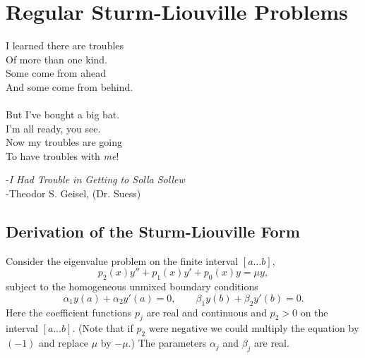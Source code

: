 \flushbottom










\chapter{Regular Sturm-Liouville Problems}



\begin{tabbing}
  I learned there are troubles \\
  Of more than one kind. \\
  Some come from ahead \\
  And some come from behind. \\
  \\
  But I've bought a big bat. \\
  I'm all ready, you see. \\
  Now my troubles are going \\
  To have troubles with \textit{me}!
\end{tabbing}

\begin{flushright}
  -\textit{I Had Trouble in Getting to Solla Sollew}\\
  -Theodor S. Geisel, (Dr. Suess)
\end{flushright}










\section{Derivation of the Sturm-Liouville Form}



Consider the eigenvalue problem on the finite interval $[a \ldots b]$,
\[ 
p_2(x) y'' + p_1(x) y' + p_0(x) y = \mu y,
\]
subject to the homogeneous unmixed boundary conditions
\[ 
\alpha_1 y(a) + \alpha_2 y'(a) = 0, \qquad
\beta_1 y(b) + \beta_2 y'(b) = 0. 
\]
Here the coefficient functions $p_j$ are real and continuous 
and $p_2 > 0$ on the interval $[a \ldots b]$.  
(Note that if $p_2$ were negative we could multiply the equation by
$(-1)$ and replace $\mu$ by $-\mu$.)
The parameters $\alpha_j$ and $\beta_j$ are real.

